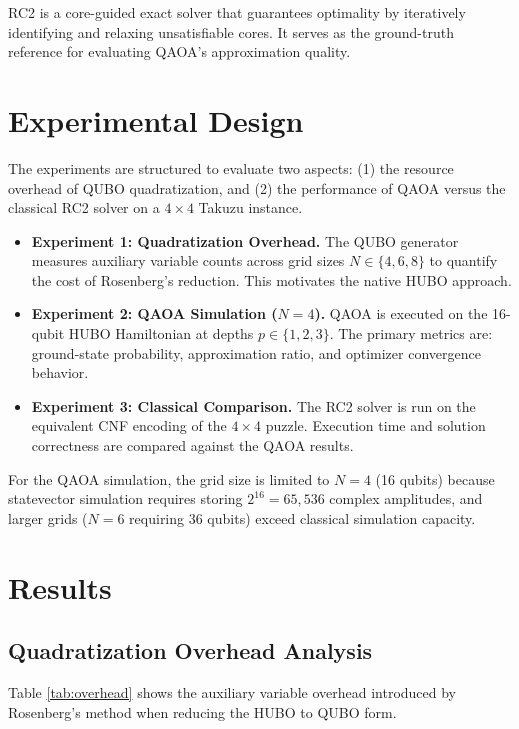 \documentclass[eng]{ajceam-class}
\begin{document}
RC2 is a core-guided exact solver that guarantees optimality by iteratively identifying and relaxing unsatisfiable cores. It serves as the ground-truth reference for evaluating QAOA's approximation quality.

\section{Experimental Design}

The experiments are structured to evaluate two aspects: (1) the resource overhead of QUBO quadratization, and (2) the performance of QAOA versus the classical RC2 solver on a $4 \times 4$ Takuzu instance.

\begin{itemize}
 \item \textbf{Experiment 1: Quadratization Overhead.} The QUBO generator measures auxiliary variable counts across grid sizes $N \in \{4, 6, 8\}$ to quantify the cost of Rosenberg's reduction. This motivates the native HUBO approach.
 \item \textbf{Experiment 2: QAOA Simulation ($N=4$).} QAOA is executed on the 16-qubit HUBO Hamiltonian at depths $p \in \{1, 2, 3\}$. The primary metrics are: ground-state probability, approximation ratio, and optimizer convergence behavior.
 \item \textbf{Experiment 3: Classical Comparison.} The RC2 solver is run on the equivalent CNF encoding of the $4 \times 4$ puzzle. Execution time and solution correctness are compared against the QAOA results.
\end{itemize}

For the QAOA simulation, the grid size is limited to $N=4$ (16 qubits) because statevector simulation requires storing $2^{16} = 65{,}536$ complex amplitudes, and larger grids ($N=6$ requiring 36 qubits) exceed classical simulation capacity.

\section{Results}

\subsection{Quadratization Overhead Analysis}

Table \ref{tab:overhead} shows the auxiliary variable overhead introduced by Rosenberg's method when reducing the HUBO to QUBO form.
\end{document}
